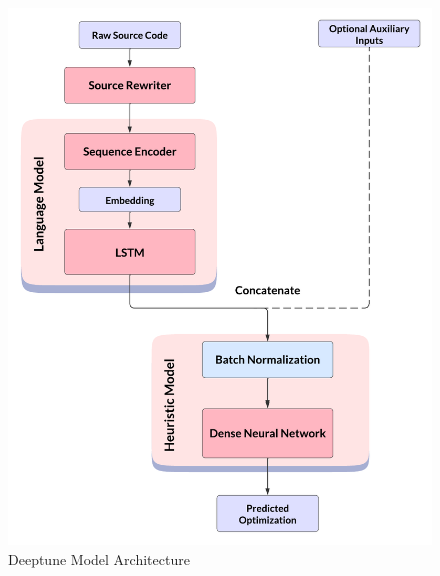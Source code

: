             \begin{figure}[hbt!]
                \begin{center}
                \includegraphics[width=.5\textwidth]{assets/images/deeptune.png}
                \end{center}
                \caption{Deeptune Model Architecture}%
                \label{sec:aco:autosched:deeptune}
            \end{figure}

